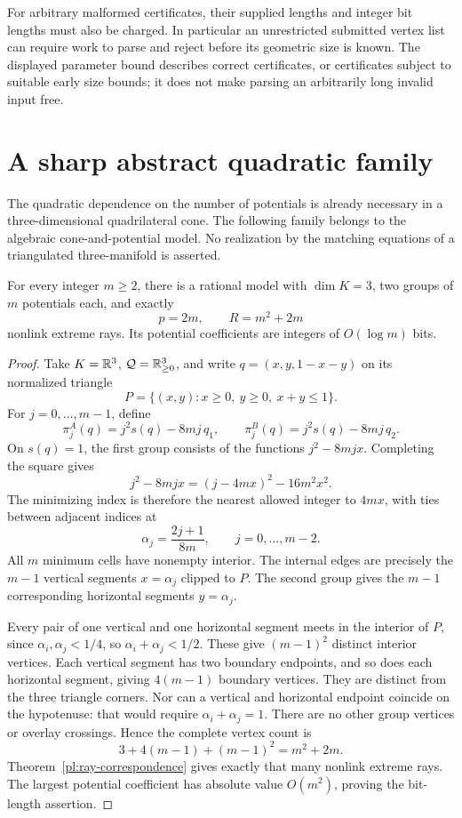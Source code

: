 For arbitrary malformed certificates, their supplied lengths and
integer bit lengths must also be charged.  In particular an
unrestricted submitted vertex list can require work to parse and
reject before its geometric size is known.  The displayed
parameter bound describes correct certificates, or certificates
subject to suitable early size bounds; it does not make parsing
an arbitrarily long invalid input free.

\section{A sharp abstract quadratic family}
\label{cf:grid}

The quadratic dependence on the number of potentials is already
necessary in a three-dimensional quadrilateral cone.
The following family belongs to the algebraic cone-and-potential
model.  No realization by the matching equations of a triangulated
three-manifold is asserted.

\begin{proposition}
\label{cf:grid-count}
For every integer \(m\geq2\), there is a rational model with
\(\dim K=3\), two groups of \(m\) potentials each, and exactly
\[
 p=2m,\qquad R=m^2+2m
\]
nonlink extreme rays.  Its potential coefficients are integers
of \(O(\log m)\) bits.
\end{proposition}
\begin{proof}
Take \(K=\mathbb{R}^3\), \(\mathcal{Q}=\mathbb{R}_{\geq0}^3\), and write
\(q=(x,y,1-x-y)\) on its normalized triangle
\[
 P=\{(x,y):x\geq0,\ y\geq0,\ x+y\leq1\}.
\]
For \(j=0,\ldots,m-1\), define
\[
 \pi^A_j(q)=j^2s(q)-8mj\,q_1,\qquad
 \pi^B_j(q)=j^2s(q)-8mj\,q_2.
\]
On \(s(q)=1\), the first group consists of the functions
\(j^2-8mjx\).  Completing the square gives
\[
 j^2-8mjx=(j-4mx)^2-16m^2x^2.
\]
The minimizing index is therefore the nearest allowed integer to
\(4mx\), with ties between adjacent indices at
\[
 \alpha_j=\frac{2j+1}{8m},
 \qquad j=0,\ldots,m-2.
\]
All \(m\) minimum cells have nonempty interior.
The internal edges are precisely the \(m-1\) vertical segments
\(x=\alpha_j\) clipped to \(P\).
The second group gives the \(m-1\) corresponding horizontal
segments \(y=\alpha_j\).

Every pair of one vertical and one horizontal segment meets in
the interior of \(P\), since
\(\alpha_i,\alpha_j<1/4\), so
\(\alpha_i+\alpha_j<1/2\).
These give \((m-1)^2\) distinct interior vertices.
Each vertical segment has two boundary endpoints, and so does
each horizontal segment, giving \(4(m-1)\) boundary vertices.
They are distinct from the three triangle corners.
Nor can a vertical and horizontal endpoint coincide on the
hypotenuse: that would require
\(\alpha_i+\alpha_j=1\).
There are no other group vertices or overlay crossings.
Hence the complete vertex count is
\[
 3+4(m-1)+(m-1)^2=m^2+2m.
\]
Theorem~\ref{pl:ray-correspondence} gives exactly that many
nonlink extreme rays.  The largest potential coefficient has
absolute value \(O(m^2)\), proving the bit-length assertion.
\end{proof}

